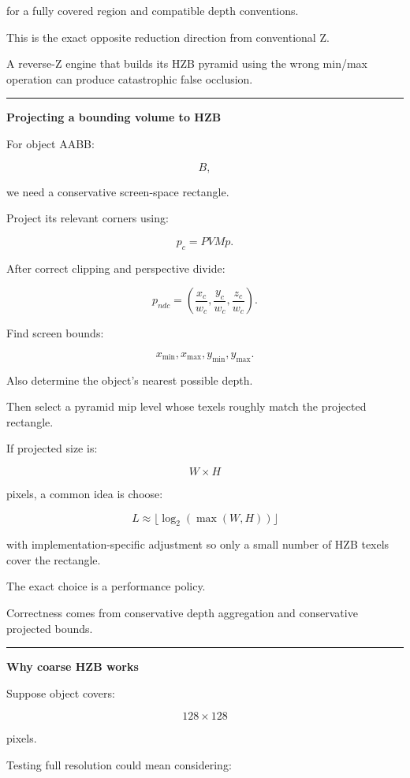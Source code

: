 for a fully covered region and compatible depth conventions.

This is the exact opposite reduction direction from conventional Z.

A reverse-Z engine that builds its HZB pyramid using the wrong min/max operation can produce catastrophic false occlusion.

\begin{center}\rule{0.5\linewidth}{0.5pt}\end{center}

\textbf{Projecting a bounding volume to HZB}

For object AABB:

\[
B,
\]

we need a conservative screen-space rectangle.

Project its relevant corners using:

\[
p_c=PVMp.
\]

After correct clipping and perspective divide:

\[
p_{ndc}=
\left(
\frac{x_c}{w_c},
\frac{y_c}{w_c},
\frac{z_c}{w_c}
\right).
\]

Find screen bounds:

\[
x_{\min},x_{\max},
y_{\min},y_{\max}.
\]

Also determine the object's nearest possible depth.

Then select a pyramid mip level whose texels roughly match the projected rectangle.

If projected size is:

\[
W\times H
\]

pixels, a common idea is choose:

\[
L\approx
\lfloor
\log_2(\max(W,H))
\rfloor
\]

with implementation-specific adjustment so only a small number of HZB texels cover the rectangle.

The exact choice is a performance policy.

Correctness comes from conservative depth aggregation and conservative projected bounds.

\begin{center}\rule{0.5\linewidth}{0.5pt}\end{center}

\textbf{Why coarse HZB works}

Suppose object covers:

\[
128\times128
\]

pixels.

Testing full resolution could mean considering:

